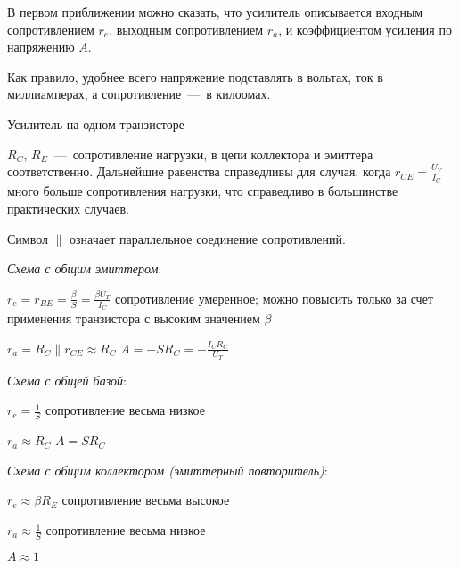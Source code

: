 \documentclass[
a4paper
,11pt
,landscape
,russian
,twocolumn
]{letter}
\newcommand\vsp{\vspace{.2in}}
\newcommand\tto{\tabto{2in}}
\begin{document}
В первом приближении можно сказать, что усилитель описывается
входным сопротивлением $r_e$, выходным сопротивлением $r_a$, и
коэффициентом усиления по напряжению $A$.

Как правило, удобнее всего напряжение подставлять в вольтах,
ток в миллиамперах, а сопротивление~---~в килоомах.

\vsp

\begin{Large}
Усилитель на одном транзисторе
\end{Large}

\vsp

$R_C$, $R_E$~---~сопротивление нагрузки, в цепи коллектора и
эмиттера соответственно. Дальнейшие равенства справедливы для
случая, когда $r_{CE}=\frac{U_Y}{I_C}$ много больше сопротивления
нагрузки, что справедливо в большинстве практических случаев.

Символ $\|$ означает параллельное соединение сопротивлений.

\vsp

\begin{raggedright}

\textit{Схема с общим эмиттером}:

$r_e=r_{BE}=\frac{\beta}{S}=\frac{\beta U_T}{I_C}$
\tto
{\small сопротивление умеренное; можно повысить}
\linebreak
\tto
{\small только за счет применения транзистора}
\linebreak
\tto
{\small с высоким значением} $\beta$

$r_a=R_C\|r_{CE}\approx R_C$
\hspace{.2in}
$A=-S R_C=-\frac{I_C R_C}{U_T}$

\vsp

\textit{Схема с общей базой}:

$r_e=\frac{1}{S}$
\tto
{\small сопротивление весьма низкое}

$r_a\approx R_C$
\hspace{.2in}
$A=S R_C$

\vsp

\textit{Схема с общим коллектором (эмиттерный повторитель)}:

$r_e\approx\beta R_E$
\tto
{\small сопротивление весьма высокое}

$r_a\approx\frac{1}{S}$
\tto
{\small сопротивление весьма низкое}

$A\approx 1$

\end{raggedright}
\end{document}
